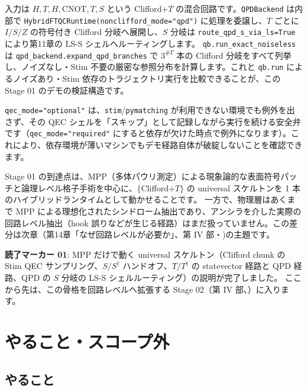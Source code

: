 入力は $H, T, H, \mathrm{CNOT}, T, S$ という Clifford+$T$ の混合回路です。\texttt{QPDBackend} は内部で \texttt{HybridFTQCRuntime(nonclifford\_mode="qpd")} に処理を委譲し、$T$ ごとに $I/S/Z$ の符号付き Clifford 分岐へ展開し、$S$ 分岐は \texttt{route\_qpd\_s\_via\_ls=True} により第11章の LS-S シェルへルーティングします。
\texttt{qb.run\_exact\_noiseless} は \texttt{qpd\_backend.expand\_qpd\_branches} で $3^{\#T}$ 本の Clifford 分岐をすべて列挙し、ノイズなし・Stim 不要の厳密な参照分布を計算します。これと \texttt{qb.run} によるノイズあり・Stim 依存のトラジェクトリ実行を比較できることが、この Stage 01 のデモの検証構造です。

\texttt{qec\_mode="optional"} は、\texttt{stim}/\texttt{pymatching} が利用できない環境でも例外を出さず、その QEC シェルを「スキップ」として記録しながら実行を続ける安全弁です（\texttt{qec\_mode="required"} にすると依存が欠けた時点で例外になります）。これにより、依存環境が薄いマシンでもデモ経路自体が破綻しないことを確認できます。

Stage 01 の到達点は、MPP（多体パウリ測定）による現象論的な表面符号パッチと論理レベル格子手術を中心に、$\{$Clifford$+T\}$ の universal スケルトンを 1 本のハイブリッドランタイムとして動かせることです。
一方で、物理層はあくまで MPP による理想化されたシンドローム抽出であり、アンシラを介した実際の回路レベル抽出（hook 誤りなどが生じる経路）はまだ扱っていません。この差分は次章（第14章「なぜ回路レベルが必要か」、第 IV 部・)の主題です。

\begin{notebox}
  \textbf{読了マーカー 01}: MPP だけで動く universal スケルトン（Clifford chunk の Stim QEC サンプリング、$S/S^\dagger$ ハンドオフ、$T/T^\dagger$ の statevector 経路と QPD 経路、QPD の $S$ 分岐の LS-S シェルルーティング）の説明が完了しました。
  ここから先は、この骨格を回路レベルへ拡張する Stage 02（第 IV 部、）に入ります。
\end{notebox}

\section{やること・スコープ外}\label{ch13:scope}

\subsection{やること}

